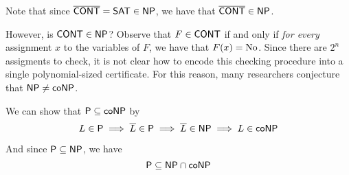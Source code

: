 Note that since $\overline{\mathsf{CONT}}=\mathsf{SAT}\in\mathsf{NP}$, we have that
$\overline{\mathsf{CONT}}\in\mathsf{NP}$.

However, is $\mathsf{CONT}\in\mathsf{NP}$? Observe that $F\in\mathsf{CONT}$ if and only if \textit{for
every} assignment $x$ to the variables of $F$, we have that $F(x)=\text{No}$. Since
there are $2^n$ assigments to check, it is not clear how to encode this
checking procedure into a single polynomial-sized certificate. For this reason,
many researchers conjecture that $\mathsf{NP}\neq\mathsf{coNP}$.

\label{e6ea03d}

We can show that $\mathsf{P}\subseteq\mathsf{coNP}$ by
$$L\in\mathsf{P}\implies\overline L\in\mathsf{P}\implies\overline L\in\mathsf{NP}\implies L\in\mathsf{coNP}$$

And since $\mathsf{P}\subseteq\mathsf{NP}$, we have
$$\mathsf{P}\subseteq\mathsf{NP}\cap\mathsf{coNP}$$


